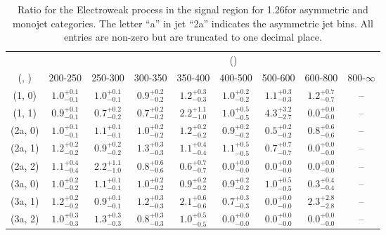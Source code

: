 \begin{table}[h!]
\tiny
\centering
\caption{Ratio for the Electroweak process in the signal region for 1.26\ifb for asymmetric and monojet categories. The letter ``a'' in jet \eg ``2a''  indicates the asymmetric jet bins. All entries are non-zero but are truncated to one decimal place.\label{tab:ratiosep_ewk_sig_asym}}
\begin{tabular}
{ccccccccc}
	\hline\hline
&	& \multicolumn{8}{c}{\scalht (\gev)} \\ 
	 (\njet,  \nb) & 200-250 & 250-300 & 300-350 & 350-400 & 400-500 & 500-600 & 600-800 & 800-$\infty$ \\ [0.8ex] 
\hline
	(1, 0) & $1.0^{+ 0.1 }_{- 0.1 }$ & $1.0^{+ 0.1 }_{- 0.1 }$ & $0.9^{+ 0.2 }_{- 0.2 }$ & $1.2^{+ 0.3 }_{- 0.3 }$ & $1.0^{+ 0.2 }_{- 0.2 }$ & $1.1^{+ 0.3 }_{- 0.3 }$ & $1.2^{+ 0.7 }_{- 0.7 }$ & -- \\[0.5ex] 
	(1, 1) & $0.9^{+ 0.1 }_{- 0.1 }$ & $0.7^{+ 0.2 }_{- 0.2 }$ & $0.7^{+ 0.2 }_{- 0.2 }$ & $2.2^{+ 1.1 }_{- 1.0 }$ & $1.0^{+ 0.5 }_{- 0.5 }$ & $4.3^{+ 3.2 }_{- 2.7 }$ & $0.0^{+ 0.0 }_{- 0.0 }$ & -- \\[0.5ex] 
	(2a, 0) & $1.0^{+ 0.1 }_{- 0.1 }$ & $1.1^{+ 0.1 }_{- 0.1 }$ & $1.0^{+ 0.2 }_{- 0.2 }$ & $1.2^{+ 0.2 }_{- 0.2 }$ & $0.9^{+ 0.2 }_{- 0.2 }$ & $0.5^{+ 0.2 }_{- 0.2 }$ & $0.8^{+ 0.6 }_{- 0.6 }$ & -- \\[0.5ex] 
	(2a, 1) & $1.2^{+ 0.2 }_{- 0.2 }$ & $0.9^{+ 0.2 }_{- 0.2 }$ & $1.3^{+ 0.3 }_{- 0.3 }$ & $1.1^{+ 0.4 }_{- 0.4 }$ & $1.1^{+ 0.5 }_{- 0.5 }$ & $0.7^{+ 0.7 }_{- 0.7 }$ & $0.0^{+ 0.0 }_{- 0.0 }$ & -- \\[0.5ex] 
	(2a, 2) & $1.1^{+ 0.4 }_{- 0.4 }$ & $2.2^{+ 1.1 }_{- 1.0 }$ & $0.8^{+ 0.6 }_{- 0.6 }$ & $0.6^{+ 0.7 }_{- 0.7 }$ & $0.0^{+ 0.0 }_{- 0.0 }$ & $0.0^{+ 0.0 }_{- 0.0 }$ & $0.0^{+ 0.0 }_{- 0.0 }$ & -- \\[0.5ex] 
	(3a, 0) & $1.0^{+ 0.2 }_{- 0.2 }$ & $1.1^{+ 0.1 }_{- 0.1 }$ & $1.0^{+ 0.2 }_{- 0.2 }$ & $0.9^{+ 0.2 }_{- 0.2 }$ & $0.9^{+ 0.2 }_{- 0.2 }$ & $1.0^{+ 0.5 }_{- 0.5 }$ & $0.3^{+ 0.4 }_{- 0.4 }$ & -- \\[0.5ex] 
	(3a, 1) & $1.2^{+ 0.2 }_{- 0.2 }$ & $0.9^{+ 0.1 }_{- 0.1 }$ & $1.2^{+ 0.3 }_{- 0.3 }$ & $2.1^{+ 0.6 }_{- 0.6 }$ & $0.7^{+ 0.3 }_{- 0.3 }$ & $0.0^{+ 0.0 }_{- 0.0 }$ & $2.3^{+ 2.8 }_{- 2.8 }$ & -- \\[0.5ex] 
	(3a, 2) & $1.0^{+ 0.3 }_{- 0.3 }$ & $1.3^{+ 0.3 }_{- 0.3 }$ & $0.8^{+ 0.3 }_{- 0.3 }$ & $1.0^{+ 0.5 }_{- 0.5 }$ & $0.0^{+ 0.0 }_{- 0.0 }$ & $0.0^{+ 0.0 }_{- 0.0 }$ & $0.0^{+ 0.0 }_{- 0.0 }$ & -- \\[0.5ex] 

\end{tabular}
\end{table}
